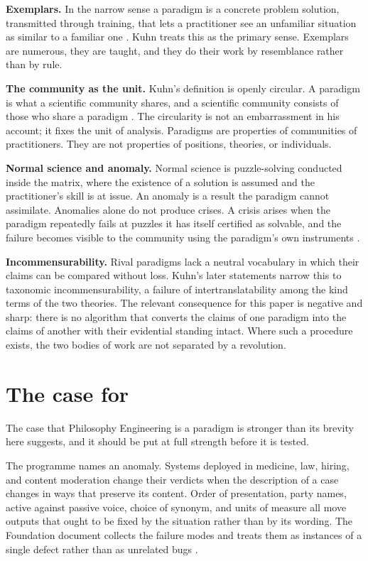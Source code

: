 \documentclass[11pt,letterpaper]{article}
\begin{document}
\textbf{Exemplars.} In the narrow sense a paradigm is a concrete problem
solution, transmitted through training, that lets a practitioner see an
unfamiliar situation as similar to a familiar one \citep{kuhn1974}. Kuhn treats
this as the primary sense. Exemplars are numerous, they are taught, and they do
their work by resemblance rather than by rule.

\textbf{The community as the unit.} Kuhn's definition is openly circular. A
paradigm is what a scientific community shares, and a scientific community
consists of those who share a paradigm \citep[Postscript]{kuhn1970}. The
circularity is not an embarrassment in his account; it fixes the unit of
analysis. Paradigms are properties of communities of practitioners. They are not
properties of positions, theories, or individuals.

\textbf{Normal science and anomaly.} Normal science is puzzle-solving conducted
inside the matrix, where the existence of a solution is assumed and the
practitioner's skill is at issue. An anomaly is a result the paradigm cannot
assimilate. Anomalies alone do not produce crises. A crisis arises when the
paradigm repeatedly fails at puzzles it has itself certified as solvable, and the
failure becomes visible to the community using the paradigm's own instruments
\citep[chs.~6--8]{kuhn1970}.

\textbf{Incommensurability.} Rival paradigms lack a neutral vocabulary in which
their claims can be compared without loss. Kuhn's later statements narrow this
to taxonomic incommensurability, a failure of intertranslatability among the
kind terms of the two theories. The relevant consequence for this paper is
negative and sharp: there is no algorithm that converts the claims of one
paradigm into the claims of another with their evidential standing intact. Where
such a procedure exists, the two bodies of work are not separated by a
revolution.

\section{The case for}

The case that Philosophy Engineering is a paradigm is stronger than its brevity
here suggests, and it should be put at full strength before it is tested.

The programme names an anomaly. Systems deployed in medicine, law, hiring, and
content moderation change their verdicts when the description of a case changes
in ways that preserve its content. Order of presentation, party names, active
against passive voice, choice of synonym, and units of measure all move outputs
that ought to be fixed by the situation rather than by its wording. The
Foundation document collects the failure modes and treats them as instances of a
single defect rather than as unrelated bugs \citep{foundation}.
\end{document}
